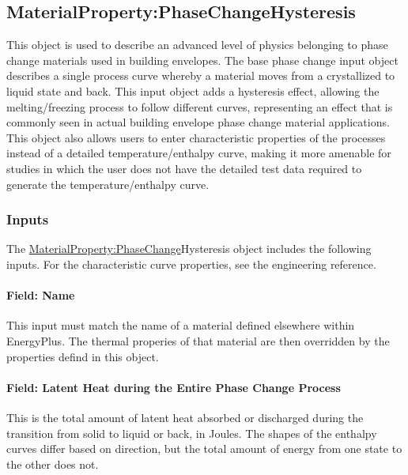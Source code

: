 \subsection{MaterialProperty:PhaseChangeHysteresis}\label{materialpropertyphasechangehysteresis}

This object is used to describe an advanced level of physics belonging to phase change materials used in building envelopes.
The base phase change input object describes a single process curve whereby a material moves from a crystallized to liquid state and back.
This input object adds a hysteresis effect, allowing the melting/freezing process to follow different curves, representing an effect that is commonly seen in actual building envelope phase change material applications.
This object also allows users to enter characteristic properties of the processes instead of a detailed temperature/enthalpy curve, making it more amenable for studies in which the user does not have the detailed test data required to generate the temperature/enthalpy curve.

\subsubsection{Inputs}\label{materialpropertyphasechangehysteresis-inputs}

The \hyperref[materialpropertyphasechange]{MaterialProperty:PhaseChange}Hysteresis object includes the following inputs.  For the characteristic curve properties, see the engineering reference.

\paragraph{Field: Name}\label{materialpropertyphasechangehysteresis-name}

This input must match the name of a material defined elsewhere within EnergyPlus.  The thermal properies of that material are then overridden by the properties defind in this object.

\paragraph{Field: Latent Heat during the Entire Phase Change Process}\label{materialpropertyphasechangehysteresis-inputs-latent-heat-during-the-entire-phase-change-process}

This is the total amount of latent heat absorbed or discharged during the transition from solid to liquid or back, in Joules.
The shapes of the enthalpy curves differ based on direction, but the total amount of energy from one state to the other does not.

